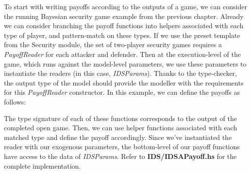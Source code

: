 To start with writing payoffs according to the outputs of a game, we can consider the running Bayesian security game example from the previous chapter. Already we can consider branching the payoff functions into helpers associated with each type of player, and pattern-match on these types. If we use the preset template from the Security module, the set of two-player security games requires a \textit{PayoffReader} for each attacker and defender. Then at the execution-level of the game, which runs against the model-level parameters, we use these parameters to instantiate the readers (in this case, \textit{IDSParams}). Thanks to the type-checker, the output type of the model should provide the modeller with the requirements for this \textit{PayoffReader} constructor. In this example, we can define the payoffs as follows: 

\resethooks

The type signature of each of these functions corresponds to the output of the completed open game. Then, we can use helper functions associated with each matched type and define the payoff accordingly. Since we've instantiated the reader with our exogenous parameters, the bottom-level of our payoff functions have access to the data of \textit{IDSParams}. Refer to \textbf{IDS/IDSAPayoff.hs} for the complete implementation.

